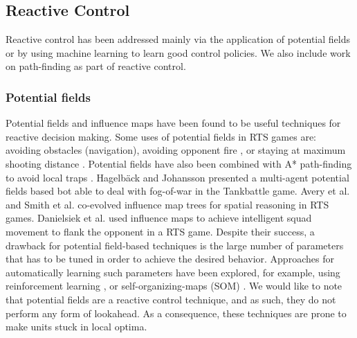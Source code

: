 \documentclass{llncs}
\begin{document}



\subsection{Reactive Control}

Reactive control has been addressed mainly via the application of potential fields or by using machine learning to learn good control policies. We also include work on path-finding as part of reactive control.


\subsubsection{Potential  fields}
Potential  fields and  influence maps  have  been found  to be  useful
techniques for reactive decision making. Some uses of potential fields
in RTS  games are: avoiding obstacles  (navigation), avoiding opponent
fire \cite{uriarte2012kiting}, or staying at maximum shooting distance
\cite{Hagelback09}. Potential  fields have also been  combined with A*
path-finding  to avoid  local traps  \cite{Hagelback12}. Hagelb\"{a}ck
and  Johansson \cite{HagelbackJ08}  presented a  multi-agent potential
fields  based bot  able  to  deal with  fog-of-war  in the  Tankbattle
game. Avery et  al. \cite{Avery09} and Smith  et al. \cite{SmithCIG10}
co-evolved  influence   map  trees   for  spatial  reasoning   in  RTS
games. Danielsiek et al. \cite{Danielsiek_2008} used influence maps to
achieve  intelligent squad  movement to  flank the  opponent in  a RTS
game.  Despite their  success,  a drawback  for potential  field-based
techniques is the  large number of parameters that has  to be tuned in
order to  achieve the  desired behavior. Approaches  for automatically
learning  such  parameters  have  been explored,  for  example,  using
reinforcement learning \cite{Liu_2008},  or self-organizing-maps (SOM)
\cite{teamCompositionRTS}. We would like to note that potential fields
are a reactive control technique, and as such, they do not perform any
form of  lookahead. As  a consequence, these  techniques are  prone to
make units stuck in local optima.
\end{document}
